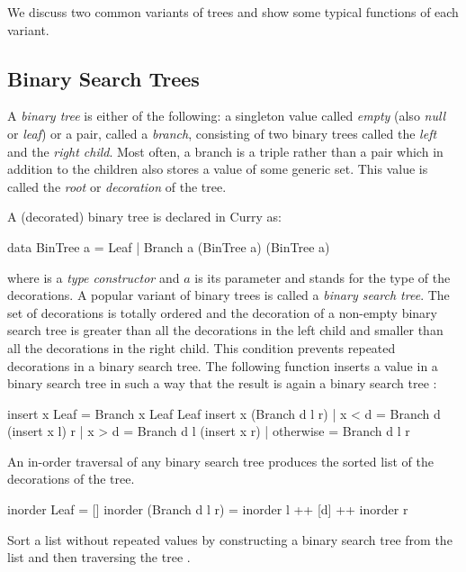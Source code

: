 We discuss two common variants of trees and show some typical functions
of each variant.

\subsection{Binary Search Trees}

A \emph{binary tree} is either of the
following: a singleton value called \emph{empty}
(also \emph{null} or \emph{leaf}) or a pair, called a
\emph{branch}, consisting of two
binary trees called the \emph{left} and the \emph{right child}.
Most often, a branch is a triple rather than a pair
which in addition to the children
also stores a value of some generic set.  This value
is called the \emph{root} or \emph{decoration}
of the tree.

\medskip\noindent
A (decorated) binary tree is declared in Curry as:
%
\begin{prog}
data BinTree a = Leaf | Branch a (BinTree a) (BinTree a)
\end{prog}
%
where  is a \emph{type constructor}
and $a$ is its parameter and stands for the type of the
decorations.
A popular variant of binary trees is called a
\emph{binary search tree}.
The set of decorations is totally ordered and the decoration
of a non-empty binary search tree is greater than all the decorations
in the left child and smaller than all the decorations
in the right child.
This condition prevents repeated decorations in a binary search tree.
The following function inserts a value in a binary search tree
in such a way that the result is again a binary search tree
:
%
\begin{prog}
insert x Leaf = Branch x Leaf Leaf
insert x (Branch d l r)
  | x < d = Branch d (insert x l) r
  | x > d = Branch d l (insert x  r)
  | otherwise = Branch d l r
\end{prog}
%
An in-order traversal of any binary search tree
produces the sorted list of the decorations of the tree.
%
\begin{prog}
inorder Leaf = []
inorder (Branch d l r) = inorder l ++ [d] ++ inorder r
\end{prog}
%
\begin{exercise}
Sort a list without repeated values by constructing
a binary search tree from the list and then traversing the
tree
.
\end{exercise}

